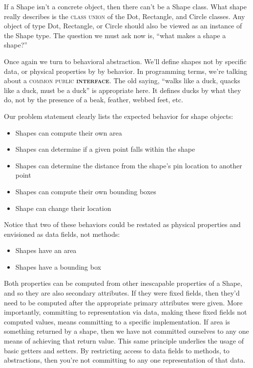\documentclass[]{tufte-handout}
\begin{document}
If a Shape isn't a concrete object, then there can't be a Shape class. What shape really describes is the \textsc{class union} of the Dot, Rectangle, and Circle classes. Any object of type Dot, Rectangle, or Circle should also be viewed as an instance of the Shape type. The question we must ask now is, ``what makes a shape a shape?'' 

Once again we turn to behavioral abstraction. We'll define shapes not by specific data, or physical properties by by behavior. In programming terms, we're talking about a \textsc{common public \textbf{interface}}. The old saying, ``walks like a duck, quacks like a duck, must be a duck'' is appropriate here. It defines ducks by what they do, not by the presence of a beak, feather, webbed feet, etc. 

Our problem statement clearly lists the expected behavior for shape objects: 
\begin{itemize}
\item Shapes can compute their own area
\item Shapes can determine if a given point falls within the shape
\item Shapes can determine the distance from the shape's pin location to another point
\item Shapes can compute their own bounding boxes
\item Shape  can change their location
\end{itemize}

Notice that two of these behaviors could be restated as physical properties and envisioned as data fields, not methods:
\begin{itemize}
\item Shapes have an area
\item Shapes have a bounding box
\end{itemize}
Both properties can be computed from other inescapable properties of a Shape, and so  they are also secondary attributes. If they were fixed fields, then they'd need to be computed after the appropriate primary attributes were given. More importantly, committing to representation via data, making these fixed fields not computed values, means committing to a specific implementation.  If area is something returned by a shape, then we have not committed ourselves to any one means of achieving that return value. This same principle underlies the usage of basic getters and setters. By restricting access to data fields to methods, to abstractions, then you're not committing to any one representation of that data. 
\end{document}
